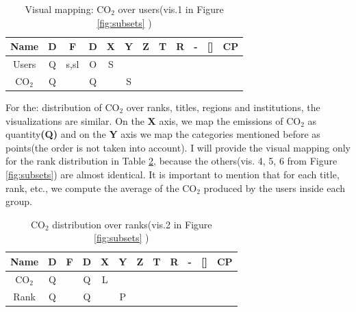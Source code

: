 \documentclass{article}
\begin{document}
 \begin{table}[h!]
 	\begin{center}
 		\begin{tabular}{|c | c | c | c || c | c | c | c | c| c| c || c|} 
 			\hline
 			Name & D & F & D\textquotesingle  & X & Y & Z & T & R & -& [] & CP \\ [0.5ex] 
 			\hline\hline
 			Users  & Q & s,sl & O &  S &   &   &   &   &   &   &   \\ [0.5ex] 
 			\hline
 			CO${_2}$  & Q &  & Q &  & S  &   &   &   &   &   &   \\ [0.5ex] 
 			\hline
 		\end{tabular}
 		\caption{Visual mapping: CO${_2}$ over users(vis.1 in Figure \ref{fig:subsets} )}
 		\label{table6}
 	\end{center}
 \end{table}

For the: distribution of CO${_2}$ over ranks, titles, regions and institutions, the visualizations are similar. On the \textbf{X} axis, we map the emissions of CO${_2}$ as quantity\textbf{(Q)} and on the \textbf{Y} axis we map the categories mentioned before as points(the order is not taken into account). I will provide the visual mapping only for the rank distribution in Table \ref{table7}, because the others(vis. 4, 5, 6 from Figure \ref{fig:subsets}) are almost identical. It is important to mention that for each title, rank, etc., we compute the average of the CO${_2}$ produced by the users inside each group.

\begin{table}[h!]
	\begin{center}
		\begin{tabular}{|c | c | c | c || c | c | c | c | c| c| c || c|} 
			\hline
			Name & D & F & D\textquotesingle  & X & Y & Z & T & R & -& [] & CP \\ [0.5ex] 
			\hline\hline
			CO${_2}$ & Q &  & Q &  L &   &   &   &   &   &   &   \\ [0.5ex] 
			\hline
			Rank  & Q &  & Q &  & P  &   &   &   &   &   &   \\ [0.5ex] 
			\hline
			
		\end{tabular}
		\caption{CO${_2}$ distribution over ranks(vis.2 in Figure \ref{fig:subsets} )}
		\label{table7}
	\end{center}
\end{table}
\end{document}
